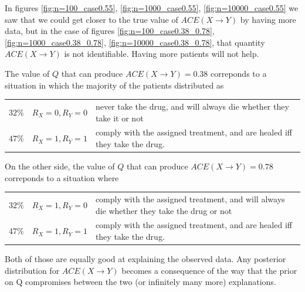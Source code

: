 \documentclass[a4paper, 10pt]{article}
\begin{document}
In figures \ref{fig:n=100_case0.55}, \ref{fig:n=1000_case0.55},
\ref{fig:n=10000_case0.55} we saw that we could get closer to the true value of
$ACE(X\rightarrow Y)$ by having more data, but in the case of figures
\ref{fig:n=100_case0.38_0.78}, \ref{fig:n=1000_case0.38_0.78},
\ref{fig:n=10000_case0.38_0.78}, that quantity $ACE(X\rightarrow Y)$ is
not identifiable. Having more patients will not help.

The value of $Q$ that can produce $ACE(X\rightarrow Y) = 0.38$ correponds to
a situation in which the majority of the patients distributed as

\begin{tabular}{ccl}
$32\%$ & $R_X=0, R_Y=0$ & never take the drug, and will always die whether they
take it or not \\
$47\%$ & $R_X=1, R_Y=1$ & comply with the assigned treatment, and are healed
iff they take the drug.
\end{tabular}

On the other side, the value of $Q$ that can produce $ACE(X\rightarrow Y) =
0.78$ correponds to a situation where

\begin{tabular}{ccl}
$32\%$ & $R_X=1, R_Y=0$ & comply with the assigned treatment, and will always
die whether they take the drug or not \\
$47\%$ & $R_X=1, R_Y=1$ & comply with the assigned treatment, and are healed
iff they take the drug.
\end{tabular}
 
Both of those are equally good at explaining the observed data. Any posterior
distribution for $ACE(X\rightarrow Y)$ becomes a consequence of the way 
that the prior on Q compromises between the two (or infinitely many more)
explanations.
\end{document}
